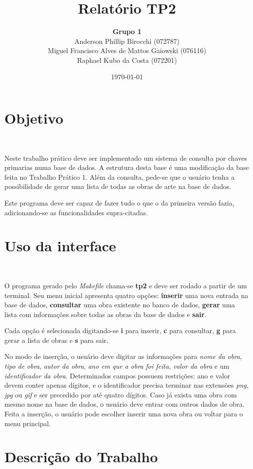 \documentclass{article}
\title{\textbf{Relatório TP2}}
\author{\textbf{Grupo 1} \\
  Anderson Phillip Birocchi (072787) \\
  Miguel Francisco Alves de Mattos Gaiowski (076116) \\
  Raphael Kubo da Costa (072201)}
\date{\today}
\begin{document}
\maketitle

\section{Objetivo}\

Neste trabalho prático deve ser implementado um sistema de consulta por chaves primarias numa base de dados. A estrutura desta base é uma modificação da base feita no Trabalho Prático 1. Além da consulta, pede-se que o usuário tenha a possibilidade de gerar uma lista de todas as obras de arte na base de dados.

Este programa deve ser capaz de fazer tudo o que o da primeira versão fazia, adicionando-se as funcionalidades supra-citadas.

\section{Uso da interface}\

O programa gerado pelo \textit{Makefile} chama-se \textbf{tp2} e deve ser rodado a partir de um terminal. Seu menu inicial apresenta quatro opções: \textbf{inserir} uma nova entrada na base de dados, \textbf{consultar} uma obra existente no banco de dados, \textbf{gerar} uma lista com informações sobre todas as obras da base de dados e \textbf{sair}.

Cada opção é selecionada digitando-se \textbf{i} para inserir, \textbf{c} para consultar, \textbf{g} para gerar a lista de obras e \textbf{s} para sair.

No modo de inserção, o usuário deve digitar as informações para \textit{nome da obra}, \textit{tipo de obra}, \textit{autor da obra}, \textit{ano em que a obra foi feita}, \textit{valor da obra} e um \textit{identificador da obra}. Determinados campos possuem restrições: ano e valor devem conter apenas dígitos, e o identificador precisa terminar nas extensões \textit{png, jpg} ou \textit{gif} e ser precedido por até quatro dígitos. Caso já exista uma obra com mesmo nome na base de dados, o usuário deve entrar com outros dados de obra. Feita a inserção, o usuário pode escolher inserir uma nova obra ou voltar para o menu principal.

\section{Descrição do Trabalho}\
\end{document}
